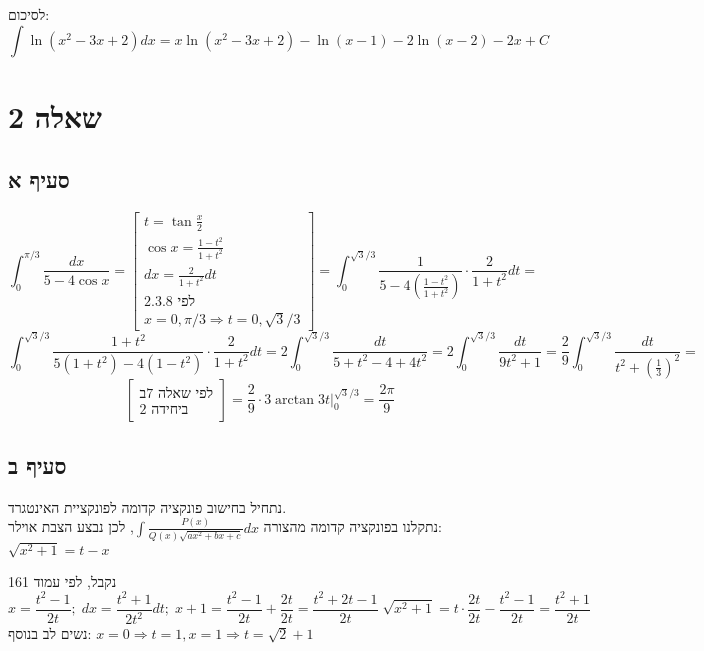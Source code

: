 \documentclass{article}
\begin{document}
לסיכום: \[
    \int \ln(x^2-3x+2)dx =
    x\ln(x^2-3x+2) - \ln(x-1) -2\ln(x-2) - 2x + C
\]

\pagebreak

\section*{שאלה 2}

\subsection*{סעיף א}

\[
    \int_0^{\pi/3} \frac{dx}{5-4\cos x} =
    \begin{bmatrix}
        t=\tan\frac{x}{2}            \\
        \cos x = \frac{1-t^2}{1+t^2} \\
        dx = \frac{2}{1+t^2}dt       \\
        \text{לפי 2.3.8}             \\
        x=0,\pi/3 \Rightarrow t=0,\sqrt{3}/3
    \end{bmatrix} =
    \int_0^{\sqrt{3}/3} \frac{1}{5-4(\frac{1-t^2}{1+t^2})} \cdot \frac{2}{1+t^2}dt =
\]
\[
    \int_0^{\sqrt{3}/3} \frac{1+t^2}{5(1+t^2)-4(1-t^2)} \cdot \frac{2}{1+t^2}dt =
    2 \int_0^{\sqrt{3}/3} \frac{dt}{5+t^2-4+4t^2} =
    2 \int_0^{\sqrt{3}/3} \frac{dt}{9t^2+1} =
    \frac{2}{9} \int_0^{\sqrt{3}/3} \frac{dt}{t^2+(\frac{1}{3})^2} =
\]
\[
    \begin{bmatrix}
        \text{לפי שאלה 7ב} \\
        \text{ביחידה 2}
    \end{bmatrix} =
    \frac{2}{9} \cdot 3\arctan 3t \bigg|_0^{\sqrt{3}/3} =
    \frac{2\pi}{9}
\]

\subsection*{סעיף ב}

נתחיל בחישוב פונקציה קדומה לפונקציית האינטגרד. \\
נתקלנו בפונקציה קדומה מהצורה $\int \frac{P(x)}{Q(x)\sqrt{ax^2+bx+c}}dx$,
לכן נבצע הצבת אוילר: $\sqrt{x^2+1}=t-x$

נקבל, לפי עמוד 161
\[
    x=\frac{t^2-1}{2t} ; \;
    dx = \frac{t^2+1}{2t^2}dt ; \;
    x+1 = \frac{t^2-1}{2t}+\frac{2t}{2t} = \frac{t^2+2t-1}{2t} \;
    \sqrt{x^2+1}=t\cdot \frac{2t}{2t}-\frac{t^2-1}{2t}=\frac{t^2+1}{2t}
\]
נשים לב בנוסף: $x=0\Rightarrow t=1, x=1 \Rightarrow t=\sqrt{2}+1$
\end{document}
